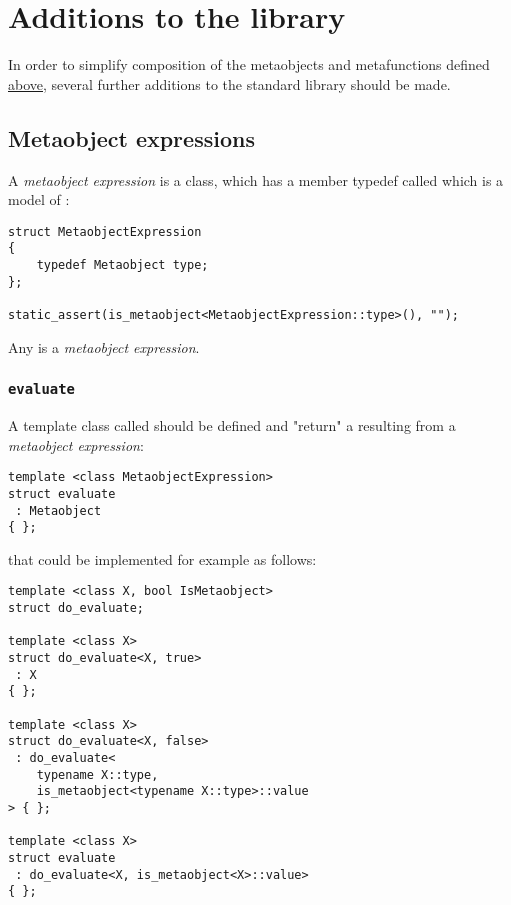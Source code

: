 \section{Additions to the library}
\label{section-Library}

In order to simplify composition of the metaobjects and metafunctions defined
\hyperref[section-Concepts]{above}, several further additions to the standard
library should be made.

\subsection{Metaobject expressions}

A {\em metaobject expression} is a class, which has a member typedef called \verb@type@
which is a model of :

\begin{verbatim}
struct MetaobjectExpression
{
	typedef Metaobject type;
};

static_assert(is_metaobject<MetaobjectExpression::type>(), "");
\end{verbatim}

Any  is a {\em metaobject expression}.

\subsubsection{\texttt{evaluate}}

A template class called \verb@evaluate@ should be defined and "return" a 
resulting from a {\em metaobject expression}:

\begin{verbatim}
template <class MetaobjectExpression>
struct evaluate
 : Metaobject
{ };
\end{verbatim}

that could be implemented for example as follows:

\begin{verbatim}
template <class X, bool IsMetaobject>
struct do_evaluate;

template <class X>
struct do_evaluate<X, true>
 : X
{ };

template <class X>
struct do_evaluate<X, false>
 : do_evaluate<
	typename X::type,
	is_metaobject<typename X::type>::value
> { };

template <class X>
struct evaluate
 : do_evaluate<X, is_metaobject<X>::value>
{ };

\end{verbatim}

